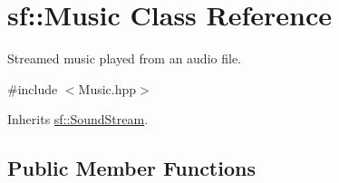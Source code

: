 \hypertarget{classsf_1_1_music}{\section{sf\+:\+:Music Class Reference}
\label{classsf_1_1_music}
}


Streamed music played from an audio file.  




{\ttfamily \#include $<$Music.\+hpp$>$}



Inherits \hyperlink{classsf_1_1_sound_stream}{sf\+::\+Sound\+Stream}.

\subsection*{Public Member Functions}
